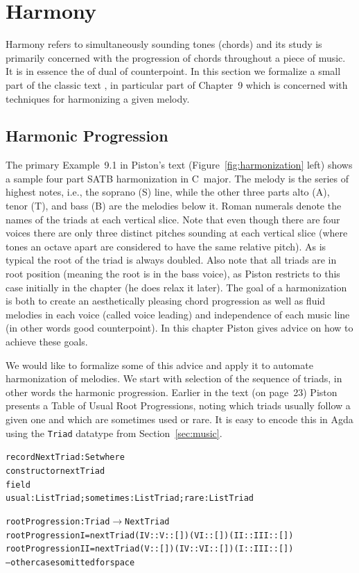 \section{Harmony}
\label{sec:harmony}

Harmony refers to simultaneously sounding tones (chords) and its study
is primarily concerned with the progression of chords throughout a
piece of music. It is in essence the of dual of counterpoint. In this
section we formalize a small part of the classic text
\citet{piston-harmony}, in particular part of Chapter~9 which is
concerned with techniques for harmonizing a given melody.

\subsection{Harmonic Progression}
\label{sec:harmony:prog}

The primary Example~9.1 in Piston's text
(Figure~\ref{fig:harmonization} left) shows a
sample four part SATB harmonization in C~major. The melody is the
series of highest notes, i.e., the soprano (S) line, while the other three
parts alto (A), tenor (T), and bass (B) are the melodies below
it. Roman numerals denote the names of the triads at each vertical
slice. Note that even though there are four voices there are only
three distinct pitches sounding at each vertical slice (where tones an
octave apart are considered to have the same relative pitch). As is
typical the root of the triad is always doubled. Also note that all
triads are in root position (meaning the root is in the bass voice),
as Piston restricts to this case initially in the chapter (he does
relax it later). The goal of a harmonization is both to create an
aesthetically pleasing chord progression as well as fluid melodies in
each voice (called voice leading) and independence of each music
line (in other words good counterpoint). In this chapter
Piston gives advice on how to achieve these goals.

\Harmonization

We would like to formalize some of this advice and apply it to
automate harmonization of melodies. We start with selection of the
sequence of triads, in other words the harmonic progression. Earlier
in the text (on page~23) Piston presents a Table of Usual Root
Progressions, noting which triads usually follow a given one and
which are sometimes used or rare. It is easy to encode this in Agda
using the \texttt{Triad} datatype from Section~\ref{sec:music}.

\begin{alltt}
record NextTriad : Set where
  constructor nextTriad
  field
    usual : List Triad; sometimes : List Triad; rare : List Triad

rootProgression : Triad \(\rightarrow\) NextTriad
rootProgression I   = nextTriad (IV :: V :: []) (VI :: []) (II :: III :: [])
rootProgression II  = nextTriad (V :: []) (IV  :: VI :: []) (I :: III :: [])
-- other cases omitted for space
\end{alltt}

